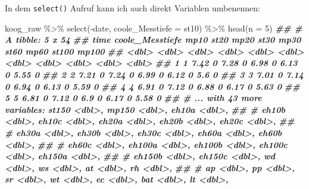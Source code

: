 \documentclass[
]{article}
\newenvironment{Shaded}{\begin{snugshade}}{\end{snugshade}}
\newcommand{\AttributeTok}[1]{\textcolor[rgb]{0.77,0.63,0.00}{#1}}
\newcommand{\DecValTok}[1]{\textcolor[rgb]{0.00,0.00,0.81}{#1}}
\newcommand{\DocumentationTok}[1]{\textcolor[rgb]{0.56,0.35,0.01}{\textbf{\textit{#1}}}}
\newcommand{\FunctionTok}[1]{\textcolor[rgb]{0.00,0.00,0.00}{#1}}
\newcommand{\NormalTok}[1]{#1}
\newcommand{\SpecialCharTok}[1]{\textcolor[rgb]{0.00,0.00,0.00}{#1}}
\begin{document}
In dem \texttt{select()} Aufruf kann ich auch direkt Variablen umbenennen:

\begin{Shaded}
\begin{Highlighting}[]
\NormalTok{koog\_raw }\SpecialCharTok{\%\textgreater{}\%}
  \FunctionTok{select}\NormalTok{(}\SpecialCharTok{{-}}\NormalTok{date, }\AttributeTok{coole\_Messtiefe =}\NormalTok{ st10) }\SpecialCharTok{\%\textgreater{}\%}
  \FunctionTok{head}\NormalTok{(}\AttributeTok{n =} \DecValTok{5}\NormalTok{)}
\DocumentationTok{\#\# \# A tibble: 5 x 54}
\DocumentationTok{\#\#    time coole\_Messtiefe  mp10  st20  mp20  st30  mp30  st60  mp60 st100 mp100}
\DocumentationTok{\#\#   \textless{}dbl\textgreater{}           \textless{}dbl\textgreater{} \textless{}dbl\textgreater{} \textless{}dbl\textgreater{} \textless{}dbl\textgreater{} \textless{}dbl\textgreater{} \textless{}dbl\textgreater{} \textless{}dbl\textgreater{} \textless{}dbl\textgreater{} \textless{}dbl\textgreater{} \textless{}dbl\textgreater{}}
\DocumentationTok{\#\# 1     1            7.42     0  7.28     0  6.98     0  6.13     0  5.55     0}
\DocumentationTok{\#\# 2     2            7.21     0  7.24     0  6.99     0  6.12     0  5.6      0}
\DocumentationTok{\#\# 3     3            7.01     0  7.14     0  6.94     0  6.13     0  5.59     0}
\DocumentationTok{\#\# 4     4            6.91     0  7.12     0  6.88     0  6.17     0  5.63     0}
\DocumentationTok{\#\# 5     5            6.81     0  7.12     0  6.9      0  6.17     0  5.58     0}
\DocumentationTok{\#\# \# ... with 43 more variables: st150 \textless{}dbl\textgreater{}, mp150 \textless{}dbl\textgreater{}, eh10a \textless{}dbl\textgreater{},}
\DocumentationTok{\#\# \#   eh10b \textless{}dbl\textgreater{}, eh10c \textless{}dbl\textgreater{}, eh20a \textless{}dbl\textgreater{}, eh20b \textless{}dbl\textgreater{}, eh20c \textless{}dbl\textgreater{},}
\DocumentationTok{\#\# \#   eh30a \textless{}dbl\textgreater{}, eh30b \textless{}dbl\textgreater{}, eh30c \textless{}dbl\textgreater{}, eh60a \textless{}dbl\textgreater{}, eh60b \textless{}dbl\textgreater{},}
\DocumentationTok{\#\# \#   eh60c \textless{}dbl\textgreater{}, eh100a \textless{}dbl\textgreater{}, eh100b \textless{}dbl\textgreater{}, eh100c \textless{}dbl\textgreater{}, eh150a \textless{}dbl\textgreater{},}
\DocumentationTok{\#\# \#   eh150b \textless{}dbl\textgreater{}, eh150c \textless{}dbl\textgreater{}, wd \textless{}dbl\textgreater{}, ws \textless{}dbl\textgreater{}, at \textless{}dbl\textgreater{}, rh \textless{}dbl\textgreater{},}
\DocumentationTok{\#\# \#   ap \textless{}dbl\textgreater{}, pp \textless{}dbl\textgreater{}, sr \textless{}dbl\textgreater{}, wt \textless{}dbl\textgreater{}, ec \textless{}dbl\textgreater{}, bat \textless{}dbl\textgreater{}, lt \textless{}dbl\textgreater{},}

\end{Highlighting}
\end{Shaded}
\end{document}
